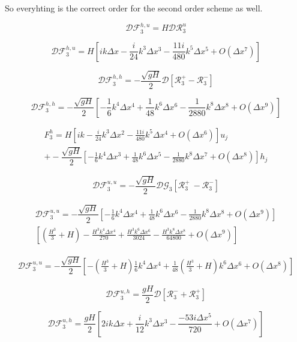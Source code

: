 \documentclass[12pt]{article}
\begin{document}
So everyhting is the correct order for the second order scheme as well. 


\[\mathcal{D}\mathcal{F}_3^{h,u} = H\mathcal{D}\mathcal{R}_3^u\]

\[\mathcal{D}\mathcal{F}_3^{h,u} = H\left[i k \Delta x - \frac{i}{24} k^3 \Delta x ^3 - \frac{11i}{480 }k^5 \Delta x ^5 + O(\Delta x ^7) \right]\]

\[\mathcal{D}\mathcal{F}_3^{h,h} = -\dfrac{ \sqrt{gH}}{ 2}  \mathcal{D}\left [ \mathcal{R}_3^+- \mathcal{R}_3^- \right ]\]

\[\mathcal{D}\mathcal{F}_3^{h,h} = -\dfrac{ \sqrt{gH}}{ 2}  \left [ -\frac{1}{6} k^4 \Delta x^4 + \frac{1}{48}k^6 \Delta x^6 - \frac{1}{2880}k^8 \Delta x^8 + O(\Delta x ^9) \right]\]

\begin{multline}
F^h_3 = H\left[i k - \frac{i}{24} k^3 \Delta x ^2 - \frac{11i}{480 }k^5 \Delta x ^4 + O(\Delta x ^6) \right]u_j\\+ -\dfrac{ \sqrt{gH}}{ 2}  \left [ -\frac{1}{6} k^4 \Delta x^3 + \frac{1}{48}k^6 \Delta x^5 - \frac{1}{2880}k^8 \Delta x^7 + O(\Delta x ^8) \right]h_j
\end{multline}

\[\mathcal{D}\mathcal{F}_3^{u,u} = - \dfrac{ \sqrt{gH}}{ 2} \mathcal{D}\mathcal{G}_3 \left [ \mathcal{R}_3^+ \ -  \mathcal{R}_3^-  \right]\]

\begin{multline}
\mathcal{D}\mathcal{F}_3^{u,u} = - \dfrac{ \sqrt{gH}}{ 2} \left [-\frac{1}{6} k^4 \Delta x^4 + \frac{1}{48}k^6 \Delta x^6 - \frac{1}{2880}k^8 \Delta x^8 + O(\Delta x ^9)  \right] \\ 
\left[(\frac{H^3}{3} + H) - \frac{H^3 k^4 \Delta x^4}{270} + \frac{H^3 k^6 \Delta x^6}{3024} - \frac{H^3 k^8 \Delta x^8}{64800} + O(\Delta x ^9)\right]
\end{multline}

\begin{multline}
\mathcal{D}\mathcal{F}_3^{u,u} = - \dfrac{ \sqrt{gH}}{ 2} \left [-(\frac{H^3}{3} + H)\frac{1}{6} k^4 \Delta x^4 + \frac{1}{48}(\frac{H^3}{3} + H)k^6 \Delta x^6  + O(\Delta x ^8)\right]
\end{multline}


\[\mathcal{D}\mathcal{F}_3^{u,h} = \dfrac{ gH}{ 2}\mathcal{D} [\mathcal{R}_3^- + \mathcal{R}_3^+] \]

\[\mathcal{D}\mathcal{F}_3^{u,h} = \dfrac{ gH}{ 2} \left[2i k \Delta x + \frac{i}{12} k^3 \Delta x^3 - \frac{-53 i \Delta x ^5}{720} + O(\Delta x ^7)\right] \]
\end{document}
